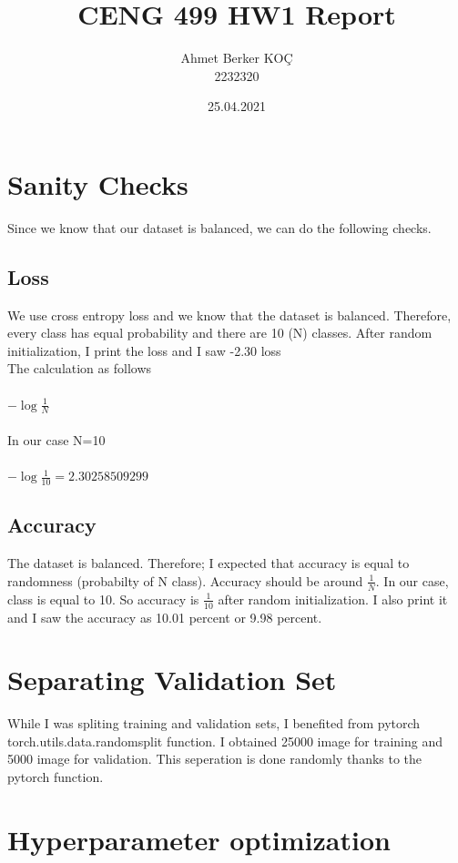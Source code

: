 \documentclass{article}
\title{CENG 499 HW1 Report}
\author{Ahmet Berker KOÇ \\ 2232320}
\date{25.04.2021}
\begin{document}
\maketitle

\section{Sanity Checks}
Since we know that our dataset is balanced, we can do the following checks.

\subsection{Loss}
We use cross entropy loss and we know that the dataset is balanced. Therefore, every class has equal probability and there are 10 (N) classes. After random initialization, I print the loss and I saw -2.30 loss \\
The calculation as follows \\ \\ 
$-\log \frac{1}{N} $ \\ \\
In our case N=10\\ \\ 
$-\log \frac{1}{10} = 2.30258509299  $ \\



\subsection{Accuracy}
The dataset is balanced. Therefore; I expected that accuracy is equal to randomness (probabilty of N class). Accuracy should be around $\frac{1}{N}$. In our case, class is equal to 10. So accuracy is $\frac{1}{10}$ after random initialization. I also print it and I saw the accuracy as 10.01 percent or 9.98 percent.  

\section{Separating Validation Set}
While I was spliting training and validation sets, I benefited from pytorch torch.utils.data.randomsplit function. I obtained 25000 image for training and 5000 image for validation. This seperation is done randomly thanks to the pytorch function. 

\section{Hyperparameter optimization}
\end{document}
